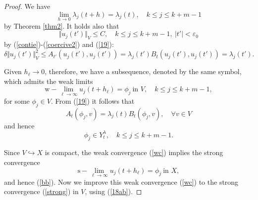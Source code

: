 \documentclass[final,a4paper]{jmsj}
\theoremstyle{thmstyleone}%
\theoremstyle{thmstyletwo}%
\theoremstyle{thmstylethree}%
\begin{document}
\begin{proof} 
We have 
\begin{equation} 
\lim_{h\rightarrow 0}\lambda_j(t+h)=\lambda_j(t), \quad k\leq j\leq k+m-1 
 \label{20}
\end{equation} 
by Theorem \ref{thm2}. It holds also that 
\begin{equation} 
\Vert u_j(t')\Vert_V\leq C, \quad k\leq j\leq k+m-1, \ \vert t'\vert<\varepsilon_0  
 \label{23}
\end{equation} 
by (\ref{contie})-(\ref{coercive2}) and (\ref{19}): 
\[ \delta \Vert u_j(t')\Vert_V^2\leq A_{t'}(u_j(t'), u_j(t'))=\lambda_j(t')B_t(u_j(t'), u_j(t'))=\lambda_j(t'). \] 

Given $h_\ell\rightarrow 0$, therefore, we have a subsequence, denoted by the same symbol, which admits the weak limits   
\begin{equation} 
\mbox{w}-\lim_{\ell\rightarrow \infty}u_j(t+h_\ell)=\phi_j \ \mbox{in $V$}, \quad k\leq j\leq k+m-1, 
 \label{wc}
\end{equation}  
for some $\phi_j\in V$. From (\ref{19}) it follows that 
\[ A_{t}(\phi_j, v)=\lambda_j(t)B_{t}(\phi_j, v), \quad \forall v\in V \] 
and hence 
\[ \phi_j\in Y_t^\lambda, \quad k\leq j\leq k+m-1. \] 

Since $V\hookrightarrow X$ is compact, the weak convergence (\ref{wc}) implies the strong convergence
\begin{equation}  
\mbox{s}-\lim_{\ell\rightarrow \infty}u_j(t+h_\ell)=\phi_j \ \mbox{in $X$},  
 \label{l2strong}
\end{equation} 
and hence (\ref{bb}). Now we improve this weak convergence (\ref{wc}) to the strong convergence (\ref{strong}) in $V$, using (\ref{18ab}). 


\end{proof}
\end{document}
